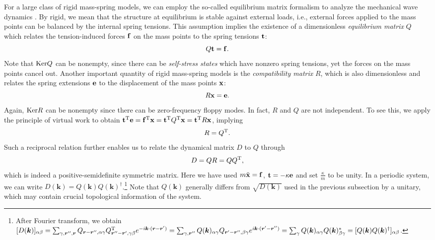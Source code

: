 \documentclass{tADP2e}
\theoremstyle{plain}
\theoremstyle{plain}
\theoremstyle{definition}
\begin{document}
\vspace{3pt}
\noindent
For a large class of rigid mass-spring models, we can employ the so-called equilibrium matrix formalism to analyze the mechanical wave dynamics \cite{TCL15}. By rigid, we mean that the structure at equilibrium is stable against external loads, i.e., external forces applied to the mass points can be balanced by the internal spring tensions. This assumption implies the existence of a dimensionless \emph{equilibrium matrix} $Q$ which relates the tension-induced forces $\bold{f}$ on the mass points to the spring tensions $\bold{t}$:
\begin{equation}
Q\bold{t}=\bold{f}.
\end{equation}
Note that ${\rm Ker}Q$ can be nonempty, since there can be \emph{self-stress states} which have nonzero spring tensions, yet the forces on the mass points cancel out. Another important quantity of rigid mass-spring models is the \emph{compatibility matrix} $R$, which is also dimensionless and relates the spring extensions $\bold{e}$ to the displacement of the mass points $\bold{x}$:
\begin{equation}
R\bold{x}=\bold{e}.
\label{Rxe}
\end{equation}
Again, ${\rm Ker}R$ can be nonempty since there can be zero-frequency floppy modes. In fact, $R$ and $Q$ are not independent. To see this, we apply the principle of virtual work \cite{CRC78} to obtain $\bold{t}^{\rm T}\bold{e}=\bold{f}^{\rm T}\bold{x}=\bold{t}^{\rm T}Q^{\rm T}\bold{x}=\bold{t}^{\rm T}R\bold{x}$, implying
\begin{equation}
R=Q^{\rm T}.
\label{CQT}
\end{equation}
Such a reciprocal relation further enables us to relate the dynamical matrix $D$ to $Q$ through 
\begin{equation}
D=QR=QQ^{\rm T},
\end{equation} 
which is indeed a positive-semidefinite symmetric matrix. Here we have used $m\ddot{\bold{x}}=\bold{f}$, $\bold{t}=-\kappa\bold{e}$ and set $\frac{\kappa}{m}$ to be unity. In a periodic system, we can write $D(\boldsymbol{k})=Q(\boldsymbol{k})Q(\boldsymbol{k})^\dag$.\footnote{After Fourier transform, we obtain $[D(\boldsymbol{k})]_{\alpha\beta}=\sum_{\gamma,\boldsymbol{r}'',\boldsymbol{r}}Q_{\boldsymbol{r}-\boldsymbol{r}'',\alpha\gamma}Q^{\rm T}_{\boldsymbol{r}''-\boldsymbol{r}',\gamma\beta}e^{-i\boldsymbol{k}\cdot(\boldsymbol{r}-\boldsymbol{r}')}=
\sum_{\gamma,\boldsymbol{r}''}Q(\boldsymbol{k})_{\alpha\gamma}Q_{\boldsymbol{r}'-\boldsymbol{r}'',\beta\gamma}e^{i\boldsymbol{k}\cdot(\boldsymbol{r}'-\boldsymbol{r}'')}=\sum_\gamma Q(\boldsymbol{k})_{\alpha\gamma}Q(\boldsymbol{k})^*_{\beta\gamma}=[Q(\boldsymbol{k})Q(\boldsymbol{k})^\dag ]_{\alpha\beta}$.}  Note that $Q(\boldsymbol{k})$  generally differs from $\sqrt{D(\boldsymbol{k})}$ used in the previous subsection by a unitary, which may contain crucial topological information of the system. 
\end{document}
